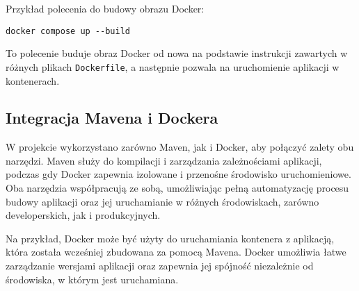 Przykład polecenia do budowy obrazu Docker:

\begin{verbatim}
docker compose up --build
\end{verbatim}

To polecenie buduje obraz Docker od nowa na podstawie instrukcji zawartych w różnych plikach \texttt{Dockerfile}, a następnie pozwala na uruchomienie aplikacji w kontenerach.

\subsection{Integracja Mavena i Dockera}

W projekcie wykorzystano zarówno Maven, jak i Docker, aby połączyć zalety obu narzędzi. Maven służy do kompilacji i zarządzania zależnościami aplikacji, podczas gdy Docker zapewnia izolowane i przenośne środowisko uruchomieniowe. Oba narzędzia współpracują ze sobą, umożliwiając pełną automatyzację procesu budowy aplikacji oraz jej uruchamianie w różnych środowiskach, zarówno developerskich, jak i produkcyjnych.

Na przykład, Docker może być użyty do uruchamiania kontenera z aplikacją, która została wcześniej zbudowana za pomocą Mavena. Docker umożliwia łatwe zarządzanie wersjami aplikacji oraz zapewnia jej spójność niezależnie od środowiska, w którym jest uruchamiana.